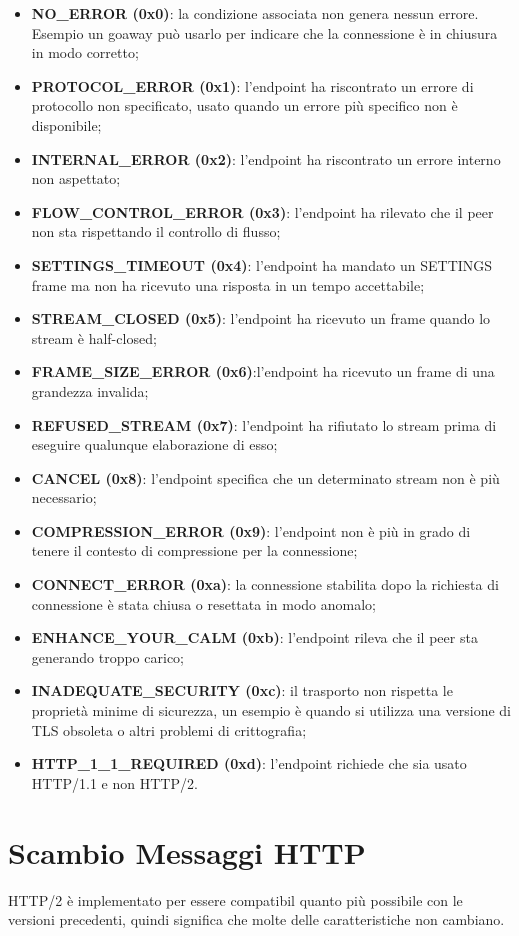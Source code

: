 \documentclass[12pt, a4paper]{article} %
\begin{document}
\begin{itemize}
  \item \textbf{NO\_ERROR (0x0)}: la condizione associata non genera nessun errore. Esempio un goaway può usarlo per indicare che la connessione è in chiusura in modo corretto; 
  \item \textbf{PROTOCOL\_ERROR (0x1)}: l'endpoint ha riscontrato un errore di protocollo non specificato, usato quando un errore più specifico non è disponibile;
  \item \textbf{INTERNAL\_ERROR (0x2)}: l'endpoint ha riscontrato un errore interno non aspettato;
  \item \textbf{FLOW\_CONTROL\_ERROR (0x3)}: l'endpoint ha rilevato che il peer non sta rispettando il controllo di flusso;
  \item \textbf{SETTINGS\_TIMEOUT (0x4)}: l'endpoint ha mandato un SETTINGS frame ma non ha ricevuto una risposta in un tempo accettabile;
  \item \textbf{STREAM\_CLOSED (0x5)}: l'endpoint ha ricevuto un frame quando lo stream è half-closed;
  \item \textbf{FRAME\_SIZE\_ERROR (0x6)}:l'endpoint ha ricevuto un frame di una grandezza invalida;
  \item \textbf{REFUSED\_STREAM (0x7)}: l'endpoint ha rifiutato lo stream prima di eseguire qualunque elaborazione di esso;
  \item \textbf{CANCEL (0x8)}: l'endpoint specifica che un determinato stream non è più necessario;
  \item \textbf{COMPRESSION\_ERROR (0x9)}: l'endpoint non è più in grado di tenere il contesto di compressione per la connessione;
  \item \textbf{CONNECT\_ERROR (0xa)}: la connessione stabilita dopo la richiesta di connessione è stata chiusa o resettata in modo anomalo;
  \item \textbf{ENHANCE\_YOUR\_CALM (0xb)}: l'endpoint rileva che il peer sta generando troppo carico;
  \item \textbf{INADEQUATE\_SECURITY (0xc)}: il trasporto non rispetta le proprietà minime di sicurezza, un esempio è quando si utilizza una versione di TLS obsoleta o altri problemi di crittografia;
  \item \textbf{HTTP\_1\_1\_REQUIRED (0xd)}: l'endpoint richiede che sia usato HTTP/1.1 e non HTTP/2.
\end{itemize}

\section{Scambio Messaggi HTTP}
HTTP/2 è implementato per essere compatibil quanto più possibile con le versioni precedenti, quindi significa che molte delle caratteristiche non cambiano.
\end{document}
